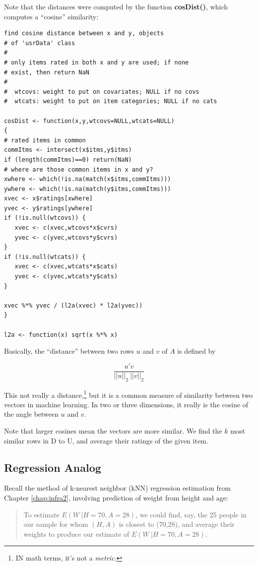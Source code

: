 Note that the distances were computed by the function
\textbf{cosDist()}, which computes a ``cosine'' similarity:

\begin{lstlisting}
find cosine distance between x and y, objects 
# of 'usrData' class 
# 
# only items rated in both x and y are used; if none 
# exist, then return NaN 
# 
#  wtcovs: weight to put on covariates; NULL if no covs 
#  wtcats: weight to put on item categories; NULL if no cats 

cosDist <- function(x,y,wtcovs=NULL,wtcats=NULL) 
{ 
# rated items in common 
commItms <- intersect(x$itms,y$itms) 
if (length(commItms)==0) return(NaN) 
# where are those common items in x and y? 
xwhere <- which(!is.na(match(x$itms,commItms))) 
ywhere <- which(!is.na(match(y$itms,commItms))) 
xvec <- x$ratings[xwhere] 
yvec <- y$ratings[ywhere] 
if (!is.null(wtcovs)) { 
   xvec <- c(xvec,wtcovs*x$cvrs) 
   yvec <- c(yvec,wtcovs*y$cvrs) 
} 
if (!is.null(wtcats)) { 
   xvec <- c(xvec,wtcats*x$cats) 
   yvec <- c(yvec,wtcats*y$cats) 
} 

xvec %*% yvec / (l2a(xvec) * l2a(yvec)) 
}

l2a <- function(x) sqrt(x %*% x) 
\end{lstlisting}

Basically, the ``distance'' between two rows $u$ and $v$
of $A$ is defined by

\begin{equation}
\frac{u'v}{||u||_2 ~ ||v||_2}
\end{equation}

This not really a distance,\footnote{IN math terms, it's not a
\textit{metric}.} but it is a common measure of similarity between two
vectors in machine learning.  In two or three dimensions, it really is
the cosine of the angle between $u$ and $v$.  

Note that larger cosines mean the vectors are more similar.  We find the
$k$ most similar rows in D to U, and average their ratings of the given
item.

\subsection{Regression Analog}

Recall the method of k-nearest neighbor (kNN) regression estimation from
Chapter \ref{chap:infra2}, involving prediction of weight from height
and age:

\begin{quote}
To estimate $E(W ~| H=70, A=28)$, we could find, say, the 25 people in our
sample for whom $(H,A)$ is closest to (70,28), and average their weights
to produce our estimate of $E(W ~| H=70, A=28)$.
\end{quote}

